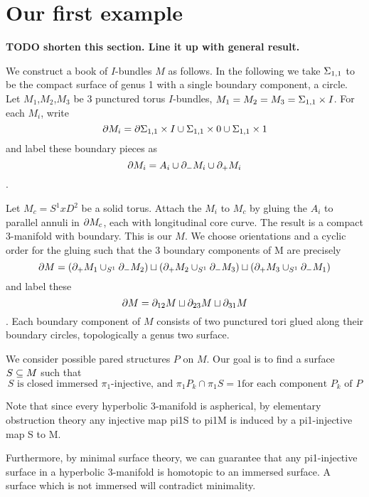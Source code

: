 \section{Our first example}

\textbf{ TODO shorten this section. Line it up with general result.}

We construct a book of $I$-bundles $M$ as follows. In the following we take
$\Sigma_{1,1}$ to be the compact surface of genus 1 with a single boundary
component, a circle. Let $M_1$,$M_2$,$M_3$ be 3 punctured torus $I$-bundles,
$M_1=M_2=M_3=\Sigma_{1,1}\times I$. For each $M_i$, write \[ \partial M_i = \partial \Sigma_{1,1}\times
I \cup \Sigma_{1,1}\times0 \cup \Sigma_{1,1} \times 1 \] and label these boundary pieces as
\[ \partial M_i = A_i \cup \partial_- M_i \cup \partial_+M_i \].

Let $M_c = S^1xD^2$ be a solid torus. Attach the $M_i$ to $M_c$ by gluing the
$A_i$ to parallel annuli in $\partial M_c$, each with longitudinal core curve. The
result is a compact 3-manifold with boundary. This is our $M$. We choose
orientations and a cyclic order for the gluing such that the 3 boundary
components of M are precisely
\[
\partial M = (\partial_+M_1 \cup_{S^1} \partial_-M_2) \sqcup (\partial_+M_2 \cup_{S^1} \partial_-M_3)
\sqcup (\partial_+M_3 \cup_{S^1} \partial_-M_1)
\]
and label these
\[
\partial M=\partial_{12}M \sqcup \partial_{23}M \sqcup \partial_{31}M
\].
Each boundary
component of $M$ consists of two punctured tori glued along their boundary
circles, topologically a genus two surface.

We consider possible pared structures $P$ on $M$. Our goal is to find
a surface $S \subseteq M$ such that
\begin{equation}\label{E:qf}
S \text{ is closed immersed $\pi_1$-injective, and  $\pi_1P_k \cap \pi_1S
= 1$
for each component $P_k$ of $P$} \tag{QF}
\end{equation}

%

Note that since every hyperbolic 3-manifold is aspherical, by elementary
obstruction theory any injective map pi1S to pi1M is induced by a pi1-injective
map S to M.

Furthermore, by minimal surface theory, we can guarantee that any pi1-injective
surface in a hyperbolic 3-manifold is homotopic to an immersed surface.
A surface which is not immersed will contradict minimality.

